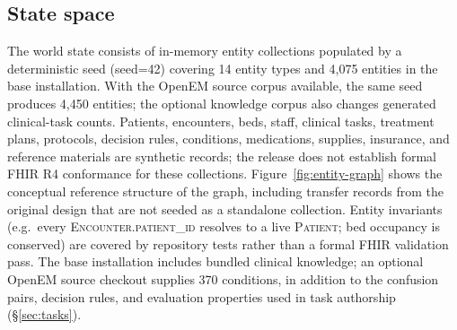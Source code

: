 \subsection{State space}
\label{sec:state}
The world state consists of in-memory entity collections populated by a
deterministic seed (seed=42)  %
covering 14 entity types  %
and 4{,}075 entities in the base installation.  %
With the OpenEM source corpus available, the same seed produces
4{,}450 entities; the optional knowledge corpus also changes generated
clinical-task counts.  %
Patients, encounters, beds, staff, clinical tasks, treatment plans,
protocols, decision rules, conditions, medications, supplies,
insurance, and reference materials are synthetic records; the release
does not establish formal FHIR R4 conformance for these collections.
Figure~\ref{fig:entity-graph} shows the conceptual reference structure
of the graph, including transfer records from the original design that
are not seeded as a standalone collection. Entity invariants
(e.g.\ every \textsc{Encounter.patient\_id} resolves to a live
\textsc{Patient}; bed occupancy is conserved) are covered by repository
tests rather than a formal FHIR validation pass. The base installation includes bundled
clinical knowledge; an optional OpenEM source checkout supplies
370 conditions,  %
in addition to the confusion pairs, decision rules, and evaluation
properties used in task authorship (\S\ref{sec:tasks}).

